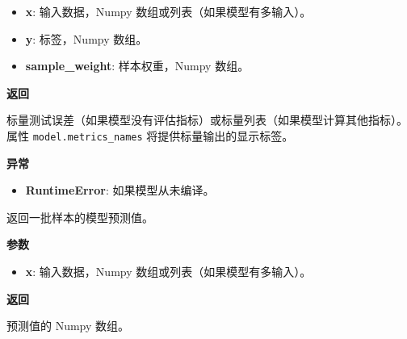 \begin{itemize}
\tightlist
\item
  \textbf{x}: 输入数据，Numpy 数组或列表（如果模型有多输入）。
\item
  \textbf{y}: 标签，Numpy 数组。
\item
  \textbf{sample\_weight}: 样本权重，Numpy 数组。
\end{itemize}

\textbf{返回}

标量测试误差（如果模型没有评估指标）或标量列表（如果模型计算其他指标）。
属性 \texttt{model.metrics\_names} 将提供标量输出的显示标签。

\textbf{异常}

\begin{itemize}
\tightlist
\item
  \textbf{RuntimeError}: 如果模型从未编译。
\end{itemize}



\label{predictux5fonux5fbatch}

\begin{Shaded}
\begin{Highlighting}[]
\end{Highlighting}
\end{Shaded}

返回一批样本的模型预测值。

\textbf{参数}

\begin{itemize}
\tightlist
\item
  \textbf{x}: 输入数据，Numpy 数组或列表（如果模型有多输入）。
\end{itemize}

\textbf{返回}

预测值的 Numpy 数组。



\label{fitux5fgenerator}

